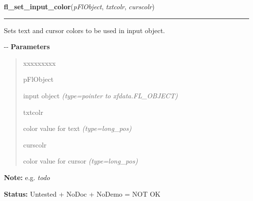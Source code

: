 \hspace{.8\funcindent}\begin{boxedminipage}{\funcwidth}

    \raggedright \textbf{fl\_set\_input\_color}(\textit{pFlObject}, \textit{txtcolr}, \textit{curscolr})

    \vspace{-1.5ex}

    \rule{\textwidth}{0.5\fboxrule}
\setlength{\parskip}{2ex}

Sets text and cursor colors to be used in input object.

-{}-
\setlength{\parskip}{1ex}
      \textbf{Parameters}
      \vspace{-1ex}

      \begin{quote}
        \begin{Ventry}{xxxxxxxxx}

          \item[pFlObject]


input object
            {\it (type=pointer to xfdata.FL\_OBJECT)}

          \item[txtcolr]


color value for text
            {\it (type=long\_pos)}

          \item[curscolr]


color value for cursor
            {\it (type=long\_pos)}

        \end{Ventry}

      \end{quote}

\textbf{Note:} 
e.g. \emph{todo}


\textbf{Status:} 
Untested + NoDoc + NoDemo = NOT OK


    \end{boxedminipage}

    \label{xformslib:flinput:fl_get_input_color}

    \vspace{0.5ex}

